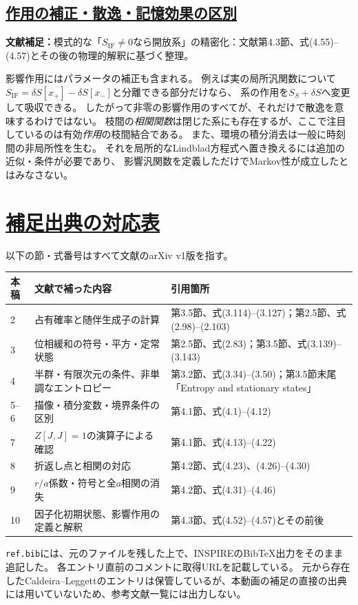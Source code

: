 \documentclass[a4paper,11pt]{ltjsarticle}
\newcommand{\sectionlink}[1]{\section[#1]{\hyperlink{toc}{#1}}}
\newcommand{\subsectionlink}[1]{\subsection[#1]{\hyperlink{toc}{#1}}}
\numberwithin{equation}{section}
\newcommand{\IF}{\mathrm{IF}}
\newcommand{\supplement}[1]{\par\medskip\noindent\textcolor{notered}{\textbf{文献補足：}}#1\par\smallskip}
\begin{document}
\subsectionlink{作用の補正・散逸・記憶効果の区別}
\label{app:if}
\supplement{模式的な「$S_{\IF}\ne0$なら開放系」の精密化：文献\cite{Pajer:2026fuo}第4.3節、式(4.55)--(4.57)とその後の物理的解釈に基づく整理。}
影響作用にはパラメータの補正も含まれる。
例えば実の局所汎関数について$S_{\IF}=\delta S[x_+]-\delta S[x_-]$と分離できる部分だけなら、
系の作用を$S_S+\delta S$へ変更して吸収できる。
したがって非零の影響作用のすべてが、それだけで散逸を意味するわけではない。
枝間の\emph{相関関数}は閉じた系にも存在するが、ここで注目しているのは有効\emph{作用}の枝間結合である。
また、環境の積分消去は一般に時刻間の非局所性を生む。
それを局所的なLindblad方程式へ置き換えるには追加の近似・条件が必要であり、
影響汎関数を定義しただけでMarkov性が成立したとはみなさない。

\clearpage
\sectionlink{補足出典の対応表}
\label{app:sources}
以下の節・式番号はすべて文献\cite{Pajer:2026fuo}のarXiv v1版を指す。
\begin{longtable}{@{}p{}p{}p{}@{}}
\toprule 本稿 & 文献で補った内容 & 引用箇所\\\midrule\endhead
2 & 占有確率と随伴生成子の計算 & 第3.5節、式(3.114)--(3.127)；第2.5節、式(2.98)--(2.103)\\
3 & 位相緩和の符号・平方・定常状態 & 第2.5節、式(2.83)；第3.5節、式(3.139)--(3.143)\\
4 & 半群・有限次元の条件、非単調なエントロピー & 第3.2節、式(3.34)--(3.50)；第3.5節末尾「Entropy and stationary states」\\
5--6 & 描像・積分変数・境界条件の区別 & 第4.1節、式(4.1)--(4.12)\\
7 & $Z[J,J]=1$の演算子による確認 & 第4.1節、式(4.13)--(4.22)\\
8 & 折返し点と相関の対応 & 第4.2節、式(4.23)、(4.26)--(4.30)\\
9 & $r/a$係数・符号と全$a$相関の消失 & 第4.2節、式(4.31)--(4.46)\\
10 & 因子化初期状態、影響作用の定義と解釈 & 第4.3節、式(4.52)--(4.57)とその前後\\\bottomrule
\end{longtable}
\noindent\texttt{ref.bib}には、元のファイルを残した上で、INSPIREのBibTeX出力をそのまま追記した。
各エントリ直前のコメントに取得URLを記載している。
元から存在したCaldeira--Leggettのエントリは保管しているが、本動画の補足の直接の出典には用いていないため、参考文献一覧には出力しない。
\clearpage
\renewcommand{\refname}{\hyperlink{toc}{参考文献}}
%

\newpage
\end{document}
